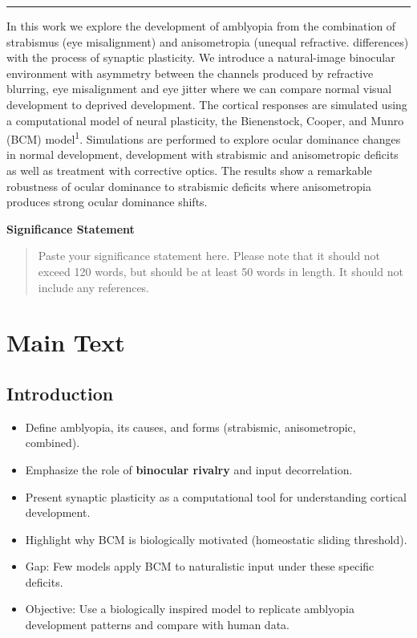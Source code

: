 \documentclass[
]{article}
\providecommand{\tightlist}{%
  \setlength{\itemsep}{0pt}\setlength{\parskip}{0pt}}
\begin{document}
\begin{center}\rule{0.5\linewidth}{0.5pt}\end{center}

In this work we explore the development of amblyopia from the
combination of strabismus (eye misalignment) and anisometropia (unequal
refractive. differences) with the process of synaptic plasticity. We
introduce a natural-image binocular environment with asymmetry between
the channels produced by refractive blurring, eye misalignment and eye
jitter where we can compare normal visual development to deprived
development. The cortical responses are simulated using a computational
model of neural plasticity, the Bienenstock, Cooper, and Munro (BCM)
model\textsuperscript{1}. Simulations are performed to explore ocular
dominance changes in normal development, development with strabismic and
anisometropic deficits as well as treatment with corrective optics. The
results show a remarkable robustness of ocular dominance to strabismic
deficits where anisometropia produces strong ocular dominance shifts.

\textbf{Significance Statement}

\begin{quote}
Paste your significance statement here. Please note that it should not
exceed 120 words, but should be at least 50 words in length. It should
not include any references.
\end{quote}

\section{Main Text}\label{sec:main-text}

\subsection{Introduction}\label{sec:introduction}

\begin{itemize}
\tightlist
\item[$\boxtimes$]
  Define amblyopia, its causes, and forms (strabismic, anisometropic,
  combined).
\item[$\boxtimes$]
  Emphasize the role of \textbf{binocular rivalry} and input
  decorrelation.
\item[$\boxtimes$]
  Present synaptic plasticity as a computational tool for understanding
  cortical development.
\item[$\boxtimes$]
  Highlight why BCM is biologically motivated (homeostatic sliding
  threshold).
\item[$\boxtimes$]
  Gap: Few models apply BCM to naturalistic input under these specific
  deficits.
\item[$\boxtimes$]
  Objective: Use a biologically inspired model to replicate amblyopia
  development patterns and compare with human data.
\end{itemize}
\end{document}
